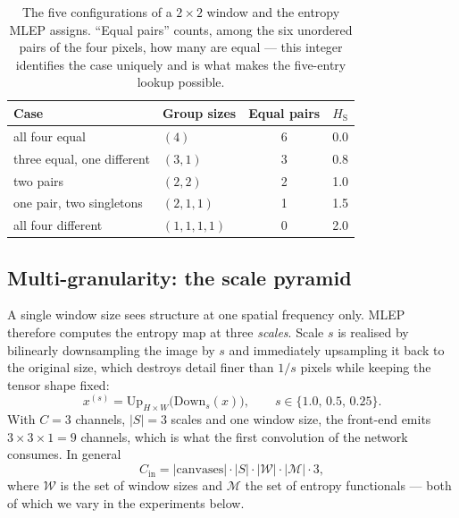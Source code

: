 \begin{table}[t]
  \centering
  \caption{The five configurations of a $2\times2$ window and the entropy MLEP
  assigns. ``Equal pairs'' counts, among the six unordered pairs of the four
  pixels, how many are equal --- this integer identifies the case uniquely and
  is what makes the five-entry lookup possible.}
  \label{tab:2x2}
  \begin{tabular}{llcc}
    \toprule
    Case & Group sizes & Equal pairs & $H_{\text{S}}$ \\
    \midrule
    all four equal            & $(4)$       & 6 & 0.0 \\
    three equal, one different& $(3,1)$     & 3 & 0.8 \\
    two pairs                 & $(2,2)$     & 2 & 1.0 \\
    one pair, two singletons  & $(2,1,1)$   & 1 & 1.5 \\
    all four different        & $(1,1,1,1)$ & 0 & 2.0 \\
    \bottomrule
  \end{tabular}
\end{table}

\subsection{Multi-granularity: the scale pyramid}

A single window size sees structure at one spatial frequency only. MLEP
therefore computes the entropy map at three \emph{scales}. Scale $s$ is realised
by bilinearly downsampling the image by $s$ and immediately upsampling it back to
the original size, which destroys detail finer than $1/s$ pixels while keeping
the tensor shape fixed:
\begin{equation}
  x^{(s)} = \text{Up}_{H\times W}\big(\text{Down}_{s}(x)\big),
  \qquad s \in \{1.0,\, 0.5,\, 0.25\}.
\end{equation}
With $C=3$ channels, $|S| = 3$ scales and one window size, the front-end emits
$3 \times 3 \times 1 = 9$ channels, which is what the first convolution of the
network consumes. In general
\begin{equation}
  C_{\text{in}} = |\text{canvases}| \cdot |S| \cdot |\mathcal{W}| \cdot |\mathcal{M}| \cdot 3,
  \label{eq:channels}
\end{equation}
where $\mathcal{W}$ is the set of window sizes and $\mathcal{M}$ the set of
entropy functionals --- both of which we vary in the experiments below.


